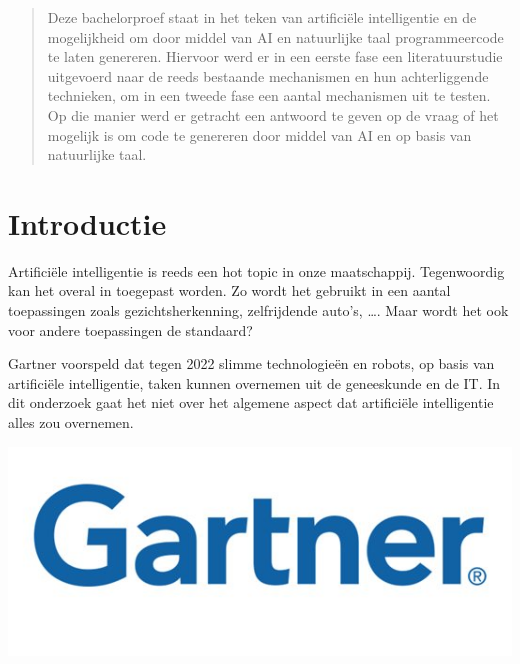 \documentclass[a0,portrait]{a0poster}
\begin{document}
\begin{multicols}{2} %


\color{HoGentAccent1} %

\begin{abstract}
Deze bachelorproef staat in het teken van artifici\"ele intelligentie en de mogelijkheid om door middel van AI en natuurlijke taal programmeercode te laten genereren. Hiervoor werd er in een eerste fase een literatuurstudie uitgevoerd naar de reeds bestaande mechanismen en hun achterliggende technieken, om in een tweede fase een aantal mechanismen uit te testen. Op die manier werd er getracht een antwoord te geven op de vraag of het mogelijk is om code te genereren door middel van AI en op basis van natuurlijke taal.
\end{abstract}

\color{HoGentAccent1} 
\section*{Introductie}
\color{black}
\color{black}
Artificiële intelligentie is reeds een hot topic in onze maatschappij. Tegenwoordig kan het overal in toegepast worden. Zo wordt het gebruikt in een aantal toepassingen zoals gezichtsherkenning, zelfrijdende auto’s, \dots. Maar wordt het ook voor andere toepassingen de standaard?

Gartner voorspeld dat tegen 2022 slimme technologieën en robots, op basis van artifici\"ele intelligentie, taken kunnen overnemen uit de geneeskunde en de IT. In dit onderzoek gaat het niet over het algemene aspect dat artifici\"ele intelligentie alles zou overnemen.

\begin{center}\vspace{1cm}
	\includegraphics[width=1.0\linewidth]{Gartner-logo1}
\end{center}\vspace{1cm}


\end{multicols}
\end{document}
